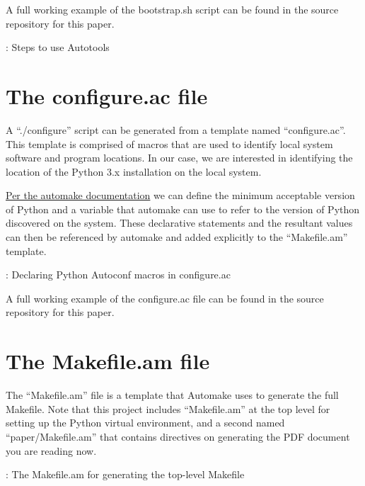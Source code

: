 \justifying
A full working example of the bootstrap.sh script can be found in the source repository for this paper.

\begin{mybox}{\thetcbcounter: Steps to use Autotools}
    
\end{mybox}
\vspace{2mm}

\section{\label{sec:config}The configure.ac file}
\vspace{2mm}
\justifying
A ``./configure'' script can be generated from a template named ``configure.ac''. This template is comprised of macros that are used to identify local system
software and program locations. In our case, we are interested in identifying the location of the Python 3.x installation on the local system.

\justifying
\href{https://www.gnu.org/software/automake/manual/html\_node/Python.html}{Per the automake documentation} we can define the minimum acceptable version of Python
and a variable that automake can use to refer to the version of Python discovered on the system. These declarative statements and the resultant values can then be
referenced by automake and added explicitly to the ``Makefile.am'' template.

\begin{mybox}{\thetcbcounter: Declaring Python Autoconf macros in configure.ac}
    
\end{mybox}
\vspace{2mm}

\justifying
A full working example of the configure.ac file can be found in the source repository for this paper.

\section{\label{sec:make}The Makefile.am file}

\justifying
The ``Makefile.am'' file is a template that Automake uses to generate the full Makefile. Note that this project includes
``Makefile.am'' at the top level for setting up the Python virtual environment, and a second named ``paper/Makefile.am''
that contains directives on generating the PDF document you are reading now.

\begin{mybox}{\thetcbcounter: The Makefile.am for generating the top-level Makefile}
    
\end{mybox}
\vspace{2mm}

